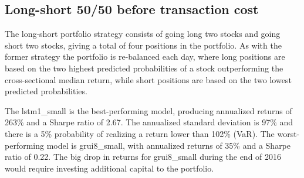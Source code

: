 \subsection{Long-short 50/50 before transaction cost}
The long-short portfolio strategy consists of going long two stocks and going short two stocks, giving a total of four positions in the portfolio. As with the former strategy the portfolio is re-balanced each day, where long positions are based on the two highest predicted probabilities of a stock outperforming the cross-sectional median return, while short positions are based on the two lowest predicted probabilities.
\indent\newline 
\begin{table}[ht]
\centering
{}
\caption{50/50 long-short small cap (2K, K=2)}
\end{table}
\indent\newline 
The lstm1\_small is the best-performing model, producing annualized returns of 263\% and a Sharpe ratio of 2.67. The annualized standard deviation is 97\% and there is a 5\% probability of realizing a return lower than 102\% (VaR). The worst-performing model is grui8\_small, with annualized returns of 35\% and a Sharpe ratio of 0.22. The big drop in returns for grui8\_small during the end of 2016 would require investing additional capital to the portfolio.  
\indent\newline 

